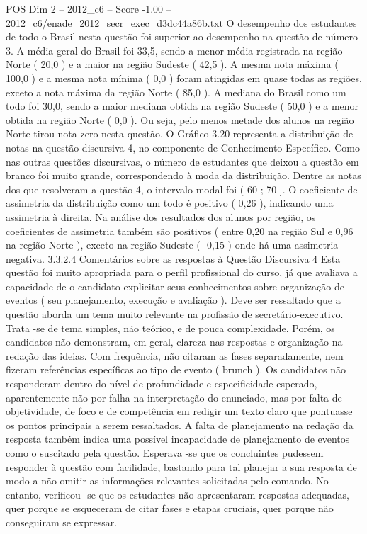 \begin{textsample}{POS Dim 2 – 2012\_c6 – Score -1.00 – 2012\_c6/enade\_2012\_secr\_exec\_d3dc44a86b.txt}
O desempenho dos estudantes de todo o Brasil nesta questão foi superior ao desempenho na questão de número 3.
A média geral do Brasil foi 33,5, sendo a menor média registrada na região Norte ( 20,0 ) e a maior na região Sudeste ( 42,5 ).
A mesma nota máxima ( 100,0 ) e a mesma nota mínima ( 0,0 ) foram atingidas em quase todas as regiões, exceto a nota máxima da região Norte ( 85,0 ).
A mediana do Brasil como um todo foi 30,0, sendo a maior mediana obtida na região Sudeste ( 50,0 ) e a menor obtida na região Norte ( 0,0 ).
Ou seja, pelo menos metade dos alunos na região Norte tirou nota zero nesta questão.
O Gráfico 3.20 representa a distribuição de notas na questão discursiva 4, no componente de Conhecimento Específico.
Como nas outras questões discursivas, o número de estudantes que deixou a questão em branco foi muito grande, correspondendo à moda da distribuição.
Dentre as notas dos que resolveram a questão 4, o intervalo modal foi ( 60 ; 70 ].
O coeficiente de assimetria da distribuição como um todo é positivo ( 0,26 ), indicando uma assimetria à direita.
Na análise dos resultados dos alunos por região, os coeficientes de assimetria também são positivos ( entre 0,20 na região Sul e 0,96 na região Norte ), exceto na região Sudeste ( -0,15 ) onde há uma assimetria negativa. 3.3.2.4 Comentários sobre as respostas à Questão Discursiva 4 Esta questão foi muito apropriada para o perfil profissional do curso, já que avaliava a capacidade de o candidato explicitar seus conhecimentos sobre organização de eventos ( seu planejamento, execução e avaliação ).
Deve ser ressaltado que a questão aborda um tema muito relevante na profissão de secretário-executivo.
Trata -se de tema simples, não teórico, e de pouca complexidade.
Porém, os candidatos não demonstram, em geral, clareza nas respostas e organização na redação das ideias.
Com frequência, não citaram as fases separadamente, nem fizeram referências específicas ao tipo de evento ( brunch ).
Os candidatos não responderam dentro do nível de profundidade e especificidade esperado, aparentemente não por falha na interpretação do enunciado, mas por falta de objetividade, de foco e de competência em redigir um texto claro que pontuasse os pontos principais a serem ressaltados.
A falta de planejamento na redação da resposta também indica uma possível incapacidade de planejamento de eventos como o suscitado pela questão.
Esperava -se que os concluintes pudessem responder à questão com facilidade, bastando para tal planejar a sua resposta de modo a não omitir as informações relevantes solicitadas pelo comando.
No entanto, verificou -se que os estudantes não apresentaram respostas adequadas, quer porque se esqueceram de citar fases e etapas cruciais, quer porque não conseguiram se expressar.

\end{textsample}

